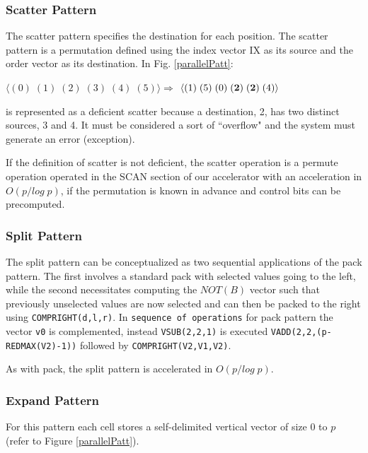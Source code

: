 \subsubsection{Scatter  Pattern}

The scatter pattern specifies the destination for each position. The scatter pattern is a permutation defined using the index vector IX as its source and the order vector as its destination. In Fig. \ref{parallelPatt}:
\begin{center}
$ \langle  (0) \; (1) \; (2) \; (3) \; (4) \; (5) \rangle  \Rightarrow $
$\langle (1) \;  (5) \; (0) \; ({\bf 2}) \; ({\bf 2}) \; (4) \rangle  $
\end{center}
is represented as a deficient scatter because a destination, 2, has two distinct sources, 3 and 4. It must be considered a sort of ``overflow" and the system must generate an error (exception).

If the definition of scatter is not deficient, the scatter operation is a permute operation operated in the SCAN section of our accelerator with an acceleration in $O(p/log \; p)$, if the permutation is known in advance and control bits can be precomputed.

\subsubsection{Split  Pattern}

The split pattern can be conceptualized as two sequential applications of the pack pattern. The first involves a standard pack with selected values going to the left, while the second necessitates computing the $NOT (B)$ vector such that previously unselected values are now selected and can then be packed to the right using {\tt COMPRIGHT(d,l,r)}. In {\tt sequence of operations} for pack pattern the vector {\tt v0} is complemented, instead {\tt VSUB(2,2,1)} is executed {\tt VADD(2,2,(p-REDMAX(V2)-1))} followed by {\tt COMPRIGHT(V2,V1,V2)}.

As with pack, the split pattern is accelerated in $O(p/log \; p)$.

\subsubsection{Expand  Pattern}

For this pattern each cell stores a self-delimited vertical vector of size $0$ to $p$ (refer to  Figure \ref{parallelPatt}).

